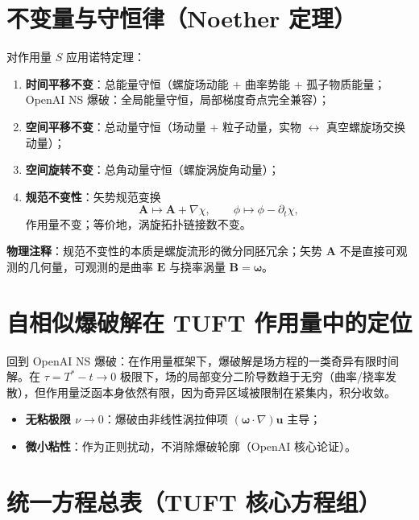 \documentclass[11pt]{ctexart}
\newcommand{\ve}[1]{\bm{#1}}                         %
\begin{document}
\section{不变量与守恒律（Noether 定理）}

对作用量 $S$ 应用诺特定理：
\begin{enumerate}
\item \textbf{时间平移不变}：总能量守恒（螺旋场动能 + 曲率势能 + 孤子物质能量；OpenAI NS 爆破：全局能量守恒，局部梯度奇点完全兼容）；
\item \textbf{空间平移不变}：总动量守恒（场动量 + 粒子动量，实物 $\leftrightarrow$ 真空螺旋场交换动量）；
\item \textbf{空间旋转不变}：总角动量守恒（螺旋涡旋角动量）；
\item \textbf{规范不变性}：矢势规范变换
\begin{equation}
\ve{A}\mapsto\ve{A}+\nabla\chi,\qquad
\phi\mapsto\phi-\partial_{t}\chi,
\label{eq:gauge}
\end{equation}
作用量不变；等价地，涡旋拓扑链接数不变。
\end{enumerate}

\noindent\textbf{物理注释}：规范不变性的本质是螺旋流形的微分同胚冗余；矢势 $\ve{A}$ 不是直接可观测的几何量，可观测的是曲率 $\ve{E}$ 与挠率涡量 $\ve{B}=\ve{\omega}$。

\section{自相似爆破解在 TUFT 作用量中的定位}

回到 OpenAI NS 爆破：在作用量框架下，爆破解是场方程的一类奇异有限时间解。在 $\tau=T^{*}-t\to0$ 极限下，场的局部变分二阶导数趋于无穷（曲率/挠率发散），但作用量泛函本身依然有限，因为奇异区域被限制在紧集内，积分收敛。

\begin{itemize}
\item \textbf{无粘极限 $\nu\to0$}：爆破由非线性涡拉伸项 $(\ve{\omega}\cdot\nabla)\ve{u}$ 主导；
\item \textbf{微小粘性}：作为正则扰动，不消除爆破轮廓（OpenAI 核心论证）。
\end{itemize}

\section{统一方程总表（TUFT 核心方程组）}
\end{document}
